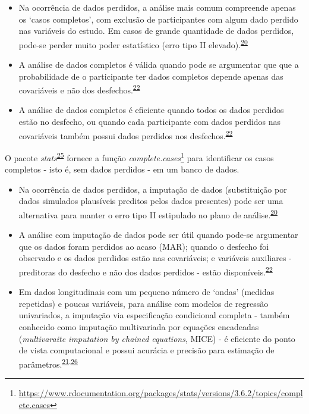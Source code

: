 \documentclass[
]{book}
\renewcommand{\href}[2]{#2\footnote{\url{#1}}}
\newenvironment{infobox}[1]
  {
  \begin{itemize}
  \renewcommand{\labelitemi}{
    \raisebox{-.7\height}[0pt][0pt]{
      {\setkeys{Gin}{width=3em,keepaspectratio}
        \texttt{[image: \#1]}}
    }
  }
  \setlength{\fboxsep}{1em}
  \begin{blackbox}
  \item
  }
  {
  \end{blackbox}
  \end{itemize}
  }
\begin{document}
\begin{itemize}
\item
  Na ocorrência de dados perdidos, a análise mais comum compreende apenas os `casos completos', com exclusão de participantes com algum dado perdido nas variáveis do estudo. Em casos de grande quantidade de dados perdidos, pode-se perder muito poder estatístico (erro tipo II elevado).\textsuperscript{\protect\hyperlink{ref-Altman2007}{20}}
\item
  A análise de dados completos é válida quando pode se argumentar que que a probabilidade de o participante ter dados completos depende apenas das covariáveis e não dos desfechos.\textsuperscript{\protect\hyperlink{ref-carpenter2021}{22}}
\item
  A análise de dados completos é eficiente quando todos os dados perdidos estão no desfecho, ou quando cada participante com dados perdidos nas covariáveis também possui dados perdidos nos desfechos.\textsuperscript{\protect\hyperlink{ref-carpenter2021}{22}}
\end{itemize}

\begin{infobox}{images/Rlogo}
O pacote \emph{stats}\textsuperscript{\protect\hyperlink{ref-stats}{25}} fornece a função \href{https://www.rdocumentation.org/packages/stats/versions/3.6.2/topics/complete.cases}{\emph{complete.cases}} para identificar os casos completos - isto é, sem dados perdidos - em um banco de dados.

\end{infobox}

\begin{itemize}
\item
  Na ocorrência de dados perdidos, a imputação de dados (substituição por dados simulados plausíveis preditos pelos dados presentes) pode ser uma alternativa para manter o erro tipo II estipulado no plano de análise.\textsuperscript{\protect\hyperlink{ref-Altman2007}{20}}
\item
  A análise com imputação de dados pode ser útil quando pode-se argumentar que os dados foram perdidos ao acaso (MAR); quando o desfecho foi observado e os dados perdidos estão nas covariáveis; e variáveis auxiliares - preditoras do desfecho e não dos dados perdidos - estão disponíveis.\textsuperscript{\protect\hyperlink{ref-carpenter2021}{22}}
\item
  Em dados longitudinais com um pequeno número de `ondas' (medidas repetidas) e poucas variáveis, para análise com modelos de regressão univariados, a imputação via especificação condicional completa - também conhecido como imputação multivariada por equações encadeadas (\emph{multivaraite imputation by chained equations}, MICE) - é eficiente do ponto de vista computacional e possui acurácia e precisão para estimação de parâmetros.\textsuperscript{\protect\hyperlink{ref-Heymans2022}{21},\protect\hyperlink{ref-Cao2022}{26}}
\end{itemize}
\end{document}
